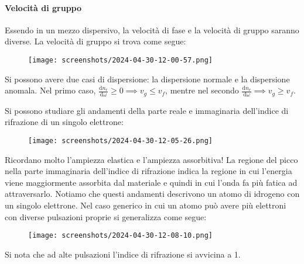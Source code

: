 \paragraph{Velocità di gruppo}
Essendo in un mezzo dispersivo, la velocità di fase e la velocità di gruppo saranno diverse. La velocità di gruppo si trova come segue:
\begin{figure}[H]
	\centering
	\texttt{[image: screenshots/2024-04-30-12-00-57.png]}
\end{figure}
\begin{remark}
	Si possono avere due casi di dispersione: la dispersione normale e la dispersione anomala. Nel primo caso, \(\frac{\mathrm{d}n_r}{\mathrm{d}\omega } \geq 0 \implies v_g \leq v_f\), mentre nel secondo \(\frac{\mathrm{d}n_r}{\mathrm{d}\omega } \implies v_g \geq v_f \).
\end{remark}
Si possono studiare gli andamenti della parte reale e immaginaria dell'indice di rifrazione di un singolo elettrone:
\begin{figure}[H]
	\centering
	\texttt{[image: screenshots/2024-04-30-12-05-26.png]}
\end{figure}
Ricordano molto l'ampiezza elastica e l'ampiezza assorbitiva! La regione del picco nella parte immaginaria dell'indice di rifrazione indica la regione in cui l'energia viene maggiormente assorbita dal materiale e quindi in cui l'onda fa più fatica ad attraversarlo. Notiamo che questi andamenti descrivono un atomo di idrogeno con un singolo elettrone. Nel caso generico in cui un atomo può avere più elettroni con diverse pulsazioni proprie si generalizza come segue:
\begin{figure}[H]
	\centering
	\texttt{[image: screenshots/2024-04-30-12-08-10.png]}
\end{figure}
Si nota che ad alte pulsazioni l'indice di rifrazione si avvicina a 1.

